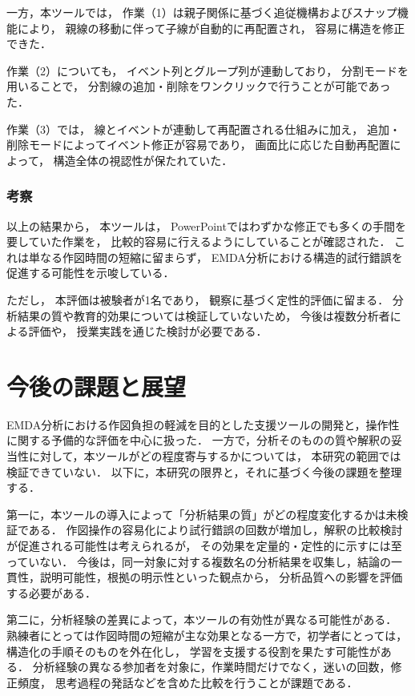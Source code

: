 一方，本ツールでは，
作業（1）は親子関係に基づく追従機構およびスナップ機能により，
親線の移動に伴って子線が自動的に再配置され，
容易に構造を修正できた．

作業（2）についても，
イベント列とグループ列が連動しており，
分割モードを用いることで，
分割線の追加・削除をワンクリックで行うことが可能であった．

作業（3）では，
線とイベントが連動して再配置される仕組みに加え，
追加・削除モードによってイベント修正が容易であり，
画面比に応じた自動再配置によって，
構造全体の視認性が保たれていた．


\subsubsection{考察}

以上の結果から，
本ツールは，
PowerPointではわずかな修正でも多くの手間を要していた作業を，
比較的容易に行えるようにしていることが確認された．
これは単なる作図時間の短縮に留まらず，
EMDA分析における構造的試行錯誤を促進する可能性を示唆している．

ただし，
本評価は被験者が1名であり，
観察に基づく定性的評価に留まる．
分析結果の質や教育的効果については検証していないため，
今後は複数分析者による評価や，
授業実践を通じた検討が必要である．

\section{今後の課題と展望}

EMDA分析における作図負担の軽減を目的とした支援ツールの開発と，操作性に関する予備的な評価を中心に扱った．
一方で，分析そのものの質や解釈の妥当性に対して，本ツールがどの程度寄与するかについては，
本研究の範囲では検証できていない．
以下に，本研究の限界と，それに基づく今後の課題を整理する．

第一に，本ツールの導入によって「分析結果の質」がどの程度変化するかは未検証である．
作図操作の容易化により試行錯誤の回数が増加し，解釈の比較検討が促進される可能性は考えられるが，
その効果を定量的・定性的に示すには至っていない．
今後は，同一対象に対する複数名の分析結果を収集し，結論の一貫性，説明可能性，根拠の明示性といった観点から，
分析品質への影響を評価する必要がある．

第二に，分析経験の差異によって，本ツールの有効性が異なる可能性がある．
熟練者にとっては作図時間の短縮が主な効果となる一方で，初学者にとっては，構造化の手順そのものを外在化し，
学習を支援する役割を果たす可能性がある．
分析経験の異なる参加者を対象に，作業時間だけでなく，迷いの回数，修正頻度，
思考過程の発話などを含めた比較を行うことが課題である．

